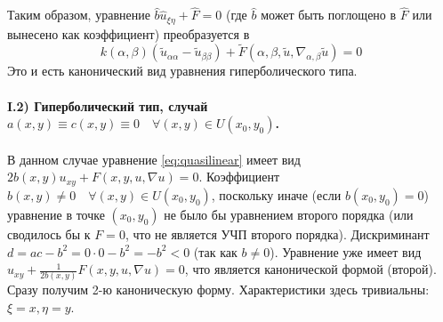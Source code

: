 \documentclass[12pt, a4paper]{article}
\begin{document}
Таким образом, уравнение $\hat{b}\hat{u}_{\xi\eta} + \hat{F} = 0$ (где $\hat{b}$ может быть поглощено в $\hat{F}$ или вынесено как коэффициент) преобразуется в
\begin{equation} \label{eq:hyperbolic_canonical_wave}
k(\alpha,\beta)(\tilde{u}_{\alpha\alpha} - \tilde{u}_{\beta\beta}) + \tilde{F}(\alpha,\beta,\tilde{u},\nabla_{\alpha,\beta}\tilde{u}) = 0
\end{equation}
Это и есть канонический вид уравнения гиперболического типа.

\paragraph{I.2) Гиперболический тип, случай $a(x,y) \equiv c(x,y) \equiv 0 \quad \forall (x,y) \in U(x_0,y_0)$.}
В данном случае уравнение \eqref{eq:quasilinear} имеет вид $2b(x,y)u_{xy} + F(x,y,u,\nabla u) = 0$.
Коэффициент $b(x,y) \neq 0 \quad \forall (x,y) \in U(x_0,y_0)$, поскольку иначе (если $b(x_0,y_0)=0$) уравнение в точке $(x_0,y_0)$ не было бы уравнением второго порядка (или сводилось бы к $F=0$, что не является УЧП второго порядка).
Дискриминант $d = ac - b^2 = 0 \cdot 0 - b^2 = -b^2 < 0$ (так как $b \neq 0$).
Уравнение уже имеет вид $u_{xy} + \frac{1}{2b(x,y)}F(x,y,u,\nabla u) = 0$, что является канонической формой (второй).
Сразу получим 2-ю каноническую форму.
Характеристики здесь тривиальны: $\xi=x, \eta=y$.
\end{document}
